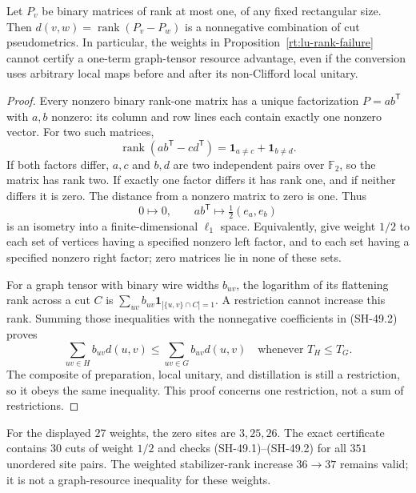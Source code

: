 \begin{proposition}
\label{prop:rank-one-binary-l1}
Let $P_v$ be binary matrices of rank at most one, of any fixed
rectangular size.  Then $d(v,w)=\operatorname{rank}(P_v-P_w)$
is a nonnegative combination of cut pseudometrics.  In particular,
the weights in Proposition~\ref{rt:lu-rank-failure} cannot certify
a one-term graph-tensor resource advantage, even if the conversion
uses arbitrary local maps before and after its non-Clifford local
unitary.
\end{proposition}
\begin{proof}
Every nonzero binary rank-one matrix has a unique factorization
$P=ab^{\mathsf T}$ with $a,b$ nonzero: its column and row lines
each contain exactly one nonzero vector.  For two such matrices,
\[
 \operatorname{rank}(ab^{\mathsf T}-cd^{\mathsf T})
   =\boldsymbol 1_{a\ne c}+\boldsymbol 1_{b\ne d}.       \tag{SH-49.1}
\]
If both factors differ, $a,c$ and $b,d$ are two independent
pairs over $\mathbb F_2$, so the matrix has rank two.  If exactly
one factor differs it has rank one, and if neither differs it
is zero.  The distance from a nonzero matrix to zero is one.
Thus
\[
 0\longmapsto0,\qquad
 ab^{\mathsf T}\longmapsto\tfrac12(e_a,e_b)
                                                               \tag{SH-49.2}
\]
is an isometry into a finite-dimensional $\ell_1$ space.  Equivalently,
give weight $1/2$ to each set of vertices having a specified
nonzero left factor, and to each set having a specified nonzero
right factor; zero matrices lie in none of these sets.

For a graph tensor with binary wire widths $b_{uv}$, the logarithm
of its flattening rank across a cut $C$ is
$\sum_{uv}b_{uv}\boldsymbol 1_{|\{u,v\}\cap C|=1}$.
A restriction cannot increase this rank.  Summing those
inequalities with the nonnegative coefficients in (SH-49.2)
proves
\[
 \sum_{uv\in H}b_{uv}d(u,v)
 \le \sum_{uv\in G}b_{uv}d(u,v)
 \quad\text{whenever }T_H\le T_G.                      \tag{SH-49.3}
\]
The composite of preparation, local unitary, and distillation
is still a restriction, so it obeys the same inequality.
This proof concerns one restriction, not a sum of restrictions.
\end{proof}

For the displayed $27$ weights, the zero sites are $3,25,26$.
The exact certificate contains $30$ cuts of weight $1/2$ and
checks (SH-49.1)--(SH-49.2) for all $351$ unordered site pairs.
The weighted stabilizer-rank increase $36\to37$ remains valid;
it is not a graph-resource inequality for these weights.

